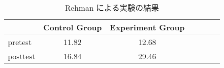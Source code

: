 \begin{table}[htb]
\centering
\begin{tabular}{lcccccc}
\toprule
& Control Group & Experiment Group \\
\midrule
pretest & 11.82 & 12.68 \\
posttest & 16.84 & 29.46 \\
\bottomrule
\end{tabular}
\caption{Rehman による実験の結果} \label{rehman_result}
\end{table}



